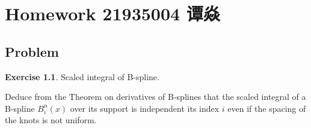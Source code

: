 \documentclass[a4paper]{book}
\makeatletter
\newcommand{\voidenvironment}[1]{%
  \expandafter\providecommand\csname env@#1@save@env\endcsname{}%
  \expandafter\providecommand\csname env@#1@process\endcsname{}%
  \@ifundefined{#1}{}{\RenewEnviron{#1}{}}%
}
\numberwithin{equation}{chapter}
\theoremstyle{definition}
\newtheorem{exc}[exm]{Exercise}
\makeatother
\begin{document}
\pagestyle{empty}
% 



\setcounter{chapter}{4}




\chapter{Homework 21935004 谭焱}



\section{Problem}\label{sec:1}

\begin{exc}
  Scaled integral of B-spline.

  Deduce from the Theorem on derivatives of B-splines that the scaled integral of a B-spline $B_i^n(x)$ over its support is independent its index $i$ even if the spacing of the knots is not uniform.
\end{exc}
\end{document}
